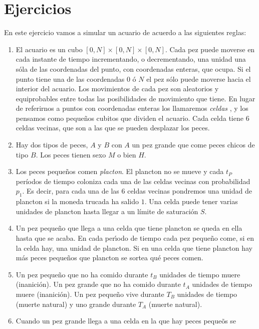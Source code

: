 \section{Ejercicios}

\begin{ejer}

En este ejercicio vamos a simular un acuario  de acuerdo a las siguientes 
reglas:
\begin{enumerate}
\item El acuario es un cubo $[0,N]\times[0,N]\times[0,N]$. Cada pez puede moverse en cada 
instante de tiempo incrementando, o decrementando,  una unidad una s\'ola de 
las coordenadas del punto,  con coordenadas enteras,  que ocupa. Si el punto 
tiene una de las coordenadas $0$ \'o $N$ el pez s\'olo puede moverse hacia el 
interior del acuario. Los movimientos de cada  pez son aleatorios y 
equiprobables entre todas las posibilidades de movimiento que tiene. En lugar 
de referirnos a puntos con coordenadas enteras los llamaremos {\itshape celdas} 
, y los pensamos como peque\~nos cubitos que dividen el acuario. Cada celda 
tiene $6$ celdas vecinas, que son a las que se pueden desplazar los peces.
\item Hay dos tipos de peces, $A$ y $B$ con $A$ un pez grande que  come  peces 
chicos de tipo  $B$. Los peces tienen sexo $M$ o bien $H$.
\item Los peces peque\~nos comen {\itshape placton}. El plancton no se mueve y 
cada $t_P$ períodos de tiempo coloniza cada una de las celdas vecinas con 
probabilidad $p_1$. Es decir, para cada una de las $6$ celdas vecinas pondremos 
una unidad de plancton si la moneda trucada ha salido $1$. Una celda puede 
tener varias unidades de plancton hasta llegar a un límite de saturación $S$.
\item Un pez peque\~no que llega a una celda que tiene plancton se queda en 
ella hasta que se acaba. En cada per\'{\i}odo de tiempo cada pez peque\~no 
come, si en la celda hay,  una unidad de plancton. Si en una celda que tiene 
plancton hay m\'as peces peque\~nos que plancton se sortea qu\'e peces comen. 
\item Un pez peque\~no que no ha comido durante $t_B$ unidades de tiempo muere 
(inanición). Un pez grande que no ha comido durante $t_A$ unidades de tiempo 
muere (inanición).  Un pez peque\~no vive durante $T_B$ unidades de tiempo 
(muerte natural) y uno grande durante $T_A$ (muerte natural).
\item Cuando un pez grande llega a una celda en la que hay peces peque\~os se 

\end{enumerate}
\end{ejer}
